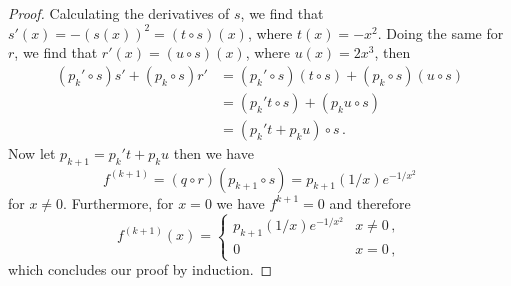 \documentclass[week=6]{homework}
\begin{document}
\begin{questions}
\begin{parts}
\begin{proof}
		    	Calculating the derivatives of $s$, we find that $s'(x) = -(s(x))^2 = (t \circ s)(x)$, where $t(x) = -x^2$. Doing the same for $r$, we find that $r'(x) = (u \circ s)(x)$, where $u(x) = 2x^3$, then
		    	\begin{align*}
			    	(p_k' \circ s)s'  + (p_k \circ s)r' &= (p_k' \circ s)(t \circ s)  + (p_k \circ s)(u \circ s) \\
			    	&= (p_k't \circ s)  + (p_ku \circ s) \\
			    	&= (p_k't + p_ku)\circ s\,.
		    	\end{align*}
		    	Now let $p_{k+1} = p_k't + p_ku$
		    	then we have
		    	\[
			    	f^{(k+1)} = (q\circ r)(p_{k+1}\circ s)= p_{k+1}(1/x)e^{-1/x^2}
			    \]
			    for $x \neq 0$. Furthermore, for $x = 0$ we have $f^{k+1} = 0$ and therefore
		    	\[
		    	f^{(k+1)}(x) = \begin{cases} p_{k+1}(1/x)e^{-1/x^2} & x\neq 0\,, \\ 0 & x = 0\,, \end{cases}
		    	\]
		    	which concludes our proof by induction.
	    	\end{proof}
	    \end{parts}
     \end{questions}
\end{document}

